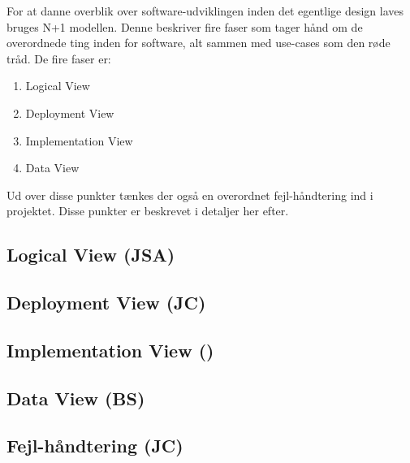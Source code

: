For at danne overblik over software-udviklingen inden det egentlige design laves bruges N+1 modellen.
Denne beskriver fire faser som tager hånd om de overordnede ting inden for software, alt sammen med use-cases som den røde tråd.
De fire faser er:

\begin{enumerate}
	\item Logical View
	\item Deployment View
	\item Implementation View
	\item Data View
\end{enumerate}

Ud over disse punkter tænkes der også en overordnet fejl-håndtering ind i projektet. Disse punkter er beskrevet i detaljer her efter.

\subsection{Logical View (JSA)}


\clearpage
\subsection{Deployment View (JC)}



\subsection{Implementation View ()}


\subsection{Data View (BS)}


\subsection{Fejl-håndtering (JC)}


%